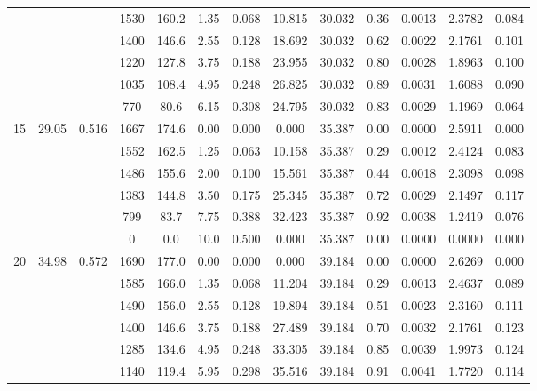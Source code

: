\documentclass[10pt]{IEEEtran}
\begin{document}
\begin{table}[ht!]
\begin{tabular}{|c|c|c|c|c|c|c|c|c|c|c|c|c|}
    \cline{4-13}
    & & & 1530 & 160.2 & 1.35 & 0.068 & 10.815 & 30.032 & 0.36 & 0.0013 & 2.3782 & 0.084 \\
    \cline{4-13}
    & & & 1400 & 146.6 & 2.55 & 0.128 & 18.692 & 30.032 & 0.62 & 0.0022 & 2.1761 & 0.101 \\
    \cline{4-13}
    & & & 1220 & 127.8 & 3.75 & 0.188 & 23.955 & 30.032 & 0.80 & 0.0028 & 1.8963 & 0.100 \\
    \cline{4-13}
    & & & 1035 & 108.4 & 4.95 & 0.248 & 26.825 & 30.032 & 0.89 & 0.0031 & 1.6088 & 0.090 \\
    \cline{4-13}
    & & & 770  & 80.6  & 6.15 & 0.308 & 24.795 & 30.032 & 0.83 & 0.0029 & 1.1969 & 0.064 \\
    \hline
    \multirow{6}{*}{15} & \multirow{6}{*}{29.05} & \multirow{6}{*}{0.516} & 1667 & 174.6 & 0.00 & 0.000 & 0.000 & 35.387 & 0.00 & 0.0000 & 2.5911 & 0.000 \\
    \cline{4-13}
    & & & 1552 & 162.5 & 1.25 & 0.063 & 10.158 & 35.387 & 0.29 & 0.0012 & 2.4124 & 0.083 \\
    \cline{4-13}
    & & & 1486 & 155.6 & 2.00 & 0.100 & 15.561 & 35.387 & 0.44 & 0.0018 & 2.3098 & 0.098 \\
    \cline{4-13}
    & & & 1383 & 144.8 & 3.50 & 0.175 & 25.345 & 35.387 & 0.72 & 0.0029 & 2.1497 & 0.117 \\
    \cline{4-13}
    & & & 799  & 83.7  & 7.75 & 0.388 & 32.423 & 35.387 & 0.92 & 0.0038 & 1.2419 & 0.076 \\
    \cline{4-13}
    & & & 0    & 0.0   & 10.0 & 0.500 & 0.000  & 35.387 & 0.00 & 0.0000 & 0.0000 & 0.000 \\
    \hline
    \multirow{6}{*}{20} & \multirow{6}{*}{34.98} & \multirow{6}{*}{0.572} & 1690 & 177.0 & 0.00 & 0.000 & 0.000 & 39.184 & 0.00 & 0.0000 & 2.6269 & 0.000 \\
    \cline{4-13}
    & & & 1585 & 166.0 & 1.35 & 0.068 & 11.204 & 39.184 & 0.29 & 0.0013 & 2.4637 & 0.089 \\
    \cline{4-13}
    & & & 1490 & 156.0 & 2.55 & 0.128 & 19.894 & 39.184 & 0.51 & 0.0023 & 2.3160 & 0.111 \\
    \cline{4-13}
    & & & 1400 & 146.6 & 3.75 & 0.188 & 27.489 & 39.184 & 0.70 & 0.0032 & 2.1761 & 0.123 \\
    \cline{4-13}
    & & & 1285 & 134.6 & 4.95 & 0.248 & 33.305 & 39.184 & 0.85 & 0.0039 & 1.9973 & 0.124 \\
    \cline{4-13}
    & & & 1140 & 119.4 & 5.95 & 0.298 & 35.516 & 39.184 & 0.91 & 0.0041 & 1.7720 & 0.114 \\
    \hline
  \end{tabular}
\end{table}
\end{document}
